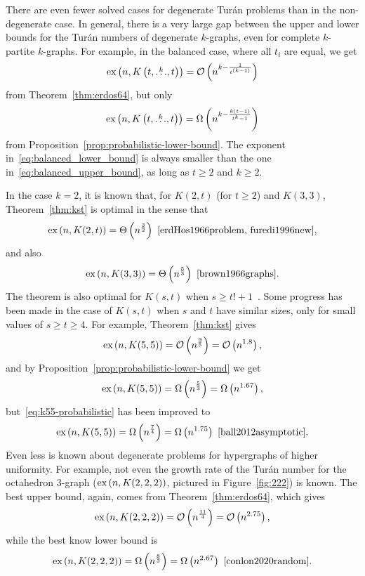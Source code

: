 There are even fewer solved cases for degenerate Turán problems than in the non-degenerate case.
In general, there is a very large gap between the upper and lower bounds for the Turán numbers of degenerate $k$-graphs,
even for complete $k$-partite $k$-graphs.
For example, in the balanced case, where all $t_i$ are equal, we get
\begin{equation} \label{eq:balanced_upper_bound}
    \text{ex} \left( n, K\left(t, \overset{k}{\dots}, t\right) \right) = \mathcal{O}\left(n^{k - \frac{1}{t^{(k-1)}}}\right)
\end{equation}
from Theorem~\ref{thm:erdos64}, but only
\begin{equation} \label{eq:balanced_lower_bound}
    \text{ex} \left( n, K\left(t, \overset{k}{\dots}, t\right) \right) = \Omega\left(n^{k - \frac{k(t-1)}{t^k - 1}}\right)
\end{equation}
from Proposition~\ref{prop:probabilistic-lower-bound}.
The exponent in~\eqref{eq:balanced_lower_bound} is always
smaller than the one in~\eqref{eq:balanced_upper_bound},
as long as $t \geq 2$ and $k \geq 2$.

In the case $k=2$, it is known that, for $K(2, t)$ (for $t \geq 2$) and $K(3, 3)$,
Theorem~\ref{thm:kst} is optimal in the sense that
\[
    \text{ex} \left( n, K(2, t) \right)
    = \Theta\left(n^{\frac{3}{2}}\right)~\cite{erdHos1966problem, furedi1996new},
\]
and also
\[
    \text{ex} \left( n, K(3, 3) \right)
    = \Theta\left(n^{\frac{5}{3}}\right)~\cite{brown1966graphs}.
\]
The theorem is also optimal for $K(s, t)$ when $s \geq t! + 1$~\cite{kollar1996norm}.
Some progress has been made in the case of $K(s, t)$ when $s$ and $t$ have similar sizes,
only for small values of $s \geq t \geq 4$.
For example, Theorem~\ref{thm:kst} gives
\[
    \text{ex} \left( n, K(5,5) \right) = \mathcal{O}\left(n^{\frac{9}{5}}\right) = \mathcal{O}\left(n^{1.8}\right),
\]
and by Proposition~\ref{prop:probabilistic-lower-bound} we get
\begin{equation} \label{eq:k55-probabilistic}
    \text{ex} \left( n, K(5,5) \right)
= \Omega\left(n^{\frac{5}{3}}\right)
= \Omega\left(n^{1.67}\right),
\end{equation}
but~\eqref{eq:k55-probabilistic} has been improved to
\[
    \text{ex} \left( n, K(5,5) \right)
    = \Omega\left(n^{\frac{7}{4}}\right)
    = \Omega\left(n^{1.75}\right)~\cite{ball2012asymptotic}.
\]
Even less is known about degenerate problems for hypergraphs of higher uniformity.
For example, not even the growth rate of the Turán number for the octahedron 3-graph
($\text{ex} \left( n, K(2, 2, 2) \right)$, pictured in Figure~\ref{fig:222}) is known.
The best upper bound, again, comes from Theorem~\ref{thm:erdos64}, which gives
\[
    \text{ex} \left( n, K(2, 2, 2) \right) = \mathcal{O}\left(n^{\frac{11}{4}}\right) = \mathcal{O}\left(n^{2.75}\right),
\]
while the best know lower bound is
\[
    \text{ex} \left( n, K(2, 2, 2) \right)
    = \Omega\left(n^{\frac{8}{3}}\right)
    = \Omega\left(n^{2.67}\right)~\cite{conlon2020random}.
\]

